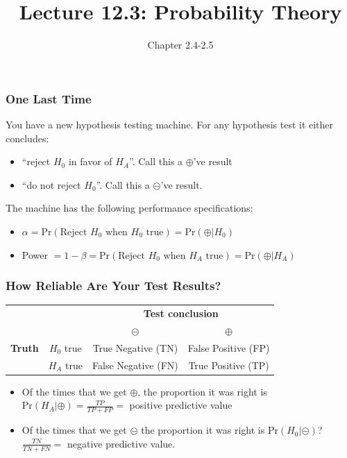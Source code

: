 \documentclass[slides]{beamer}
\title{Lecture 12.3: Probability Theory}
\author{Chapter 2.4-2.5}
\date{}
\newcommand{\blue}[1]{\textcolor{blue2}{#1}}
\newcommand{\prob}{\mbox{Pr}}
\newcommand{\cp}{\oplus}
\newcommand{\cm}{\circleddash}
\begin{document}
\begin{frame}
\titlepage
\end{frame}



\begin{frame}
\frametitle{One Last Time}
You have a new hypothesis testing machine.  For any hypothesis test it either concludes:
\begin{itemize}
\item ``reject $H_0$ in favor of $H_A$''.  Call this a $\cp$'ve result
\item ``do not reject $H_0$''.  Call this a $\cm$'ve result.
\end{itemize}
\pause
\vspace{0.5cm}

The machine has the following performance specifications:
\begin{itemize}
\item $\alpha=\prob(\mbox{Reject } H_0 \mbox{ when $H_0$ true}) = \prob(\cp|H_0)$
\item Power $=1-\beta=\prob(\mbox{Reject } H_0 \mbox{ when $H_A$ true}) = \prob(\cp|H_A)$
\end{itemize} 

\end{frame}



\begin{frame}
\frametitle{How Reliable Are Your Test Results?}

\begin{center}
  \begin{tabular}{cc|cc}
     \multicolumn{2}{c}{}  & \multicolumn{2}{c}{\textbf{Test conclusion}} \\ 
     &  & $\cm$ & $\cp$ \\ 
\hline
    \textbf{Truth} & $H_0$ true & True Negative (TN) & False Positive (FP) \\
     & $H_A$ true & False Negative (FN) & True Positive (TP)\\ 
    \hline
  \end{tabular}
\end{center}



\begin{itemize}
\pause\item Of the times that we get $\cp$, the proportion it was right is $\prob(H_A|\cp) = \frac{TP}{TP+FP} = $ \blue{positive predictive value}
\pause\item Of the times that we get $\cm$ the proportion it was right is $\prob(H_0|\cm)$? \ $\frac{TN}{TN+FN} = $ \blue{negative predictive value}.  
\end{itemize}

\end{frame}
\end{document}
